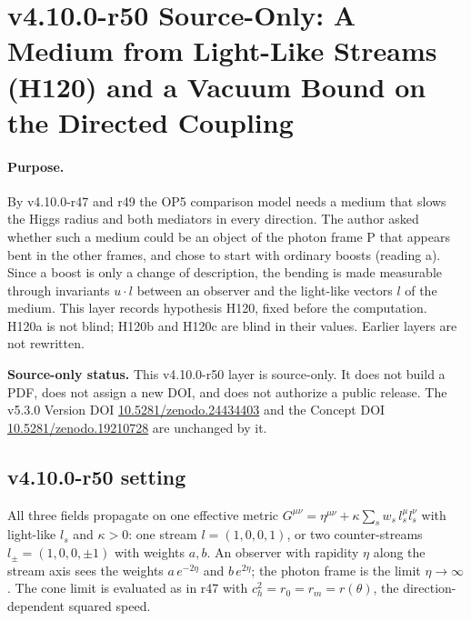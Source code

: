 \clearpage
\section*{v4.10.0-r50 Source-Only: A Medium from Light-Like Streams (H120) and a Vacuum Bound on the Directed Coupling}
\label{sec:v4100-r50-null-medium}

\paragraph{Purpose.}
By v4.10.0-r47 and r49 the OP5 comparison model needs a medium that slows the Higgs radius and both mediators in every direction.  The author
asked whether such a medium could be an object of the photon frame P that appears bent in the other frames, and chose to start with ordinary
boosts (reading a).  Since a boost is only a change of description, the bending is made measurable through invariants \(u\cdot l\) between an
observer and the light-like vectors \(l\) of the medium.  This layer records hypothesis H120, fixed before the computation.  H120a is not blind;
H120b and H120c are blind in their values.  Earlier layers are not rewritten.

\noindent\textbf{Source-only status.}
This v4.10.0-r50 layer is source-only.  It does not build a PDF, does not assign a new DOI,
and does not authorize a public release.  The v5.3.0 Version DOI
\href{https://doi.org/10.5281/zenodo.24434403}{10.5281/zenodo.24434403} and the Concept DOI
\href{https://doi.org/10.5281/zenodo.19210728}{10.5281/zenodo.19210728} are unchanged by it.

\subsection*{v4.10.0-r50 setting}
\label{subsec:v4100-r50-setting}

All three fields propagate on one effective metric \(G^{\mu\nu}=\eta^{\mu\nu}+\kappa\sum_sw_s\,l_s^\mu l_s^\nu\) with light-like \(l_s\) and \(\kappa>0\): one stream \(l=(1,0,0,1)\), or two
counter-streams \(l_\pm=(1,0,0,\pm1)\) with weights \(a,b\).  An observer with rapidity \(\eta\) along the stream axis sees the weights \(a\,e^{-2\eta}\) and \(b\,e^{2\eta}\); the
photon frame is the limit \(\eta\to\infty\).  The cone limit is evaluated as in r47 with \(c_h^2=r_0=r_m=r(\theta)\), the direction-dependent squared speed.

